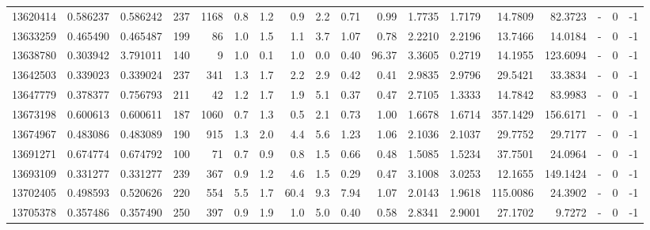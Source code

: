 \begin{tabular}{rrrrrrrrrrrrrrrlrr}
  13620414 & 0.586237 &   0.586242 &  237 & 1168 &      0.8 &      1.2 &     0.9 &      2.2 &       0.71 &        0.99 &  1.7735 &  1.7179 &   14.7809 &   82.3723 &             - &        0 &         -1 \\
  13633259 & 0.465490 &   0.465487 &  199 &   86 &      1.0 &      1.5 &     1.1 &      3.7 &       1.07 &        0.78 &  2.2210 &  2.2196 &   13.7466 &   14.0184 &             - &        0 &         -1 \\
  13638780 & 0.303942 &   3.791011 &  140 &    9 &      1.0 &      0.1 &     1.0 &      0.0 &       0.40 &       96.37 &  3.3605 &  0.2719 &   14.1955 &  123.6094 &             - &        0 &         -1 \\
  13642503 & 0.339023 &   0.339024 &  237 &  341 &      1.3 &      1.7 &     2.2 &      2.9 &       0.42 &        0.41 &  2.9835 &  2.9796 &   29.5421 &   33.3834 &             - &        0 &         -1 \\
  13647779 & 0.378377 &   0.756793 &  211 &   42 &      1.2 &      1.7 &     1.9 &      5.1 &       0.37 &        0.47 &  2.7105 &  1.3333 &   14.7842 &   83.9983 &             - &        0 &         -1 \\
  13673198 & 0.600613 &   0.600611 &  187 & 1060 &      0.7 &      1.3 &     0.5 &      2.1 &       0.73 &        1.00 &  1.6678 &  1.6714 &  357.1429 &  156.6171 &             - &        0 &         -1 \\
  13674967 & 0.483086 &   0.483089 &  190 &  915 &      1.3 &      2.0 &     4.4 &      5.6 &       1.23 &        1.06 &  2.1036 &  2.1037 &   29.7752 &   29.7177 &             - &        0 &         -1 \\
  13691271 & 0.674774 &   0.674792 &  100 &   71 &      0.7 &      0.9 &     0.8 &      1.5 &       0.66 &        0.48 &  1.5085 &  1.5234 &   37.7501 &   24.0964 &             - &        0 &         -1 \\
  13693109 & 0.331277 &   0.331277 &  239 &  367 &      0.9 &      1.2 &     4.6 &      1.5 &       0.29 &        0.47 &  3.1008 &  3.0253 &   12.1655 &  149.1424 &             - &        0 &         -1 \\
  13702405 & 0.498593 &   0.520626 &  220 &  554 &      5.5 &      1.7 &    60.4 &      9.3 &       7.94 &        1.07 &  2.0143 &  1.9618 &  115.0086 &   24.3902 &             - &        0 &         -1 \\
  13705378 & 0.357486 &   0.357490 &  250 &  397 &      0.9 &      1.9 &     1.0 &      5.0 &       0.40 &        0.58 &  2.8341 &  2.9001 &   27.1702 &    9.7272 &             - &        0 &         -1 \\

\end{tabular}
